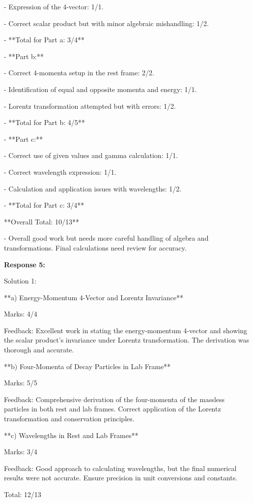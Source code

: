 \documentclass[a4paper,11pt]{article}
\begin{document}
  - Expression of the 4-vector: 1/1.
  
  - Correct scalar product but with minor algebraic mishandling: 1/2.
  
  - **Total for Part a: 3/4**

- **Part b:**

  - Correct 4-momenta setup in the rest frame: 2/2.
  
  - Identification of equal and opposite momenta and energy: 1/1.
  
  - Lorentz transformation attempted but with errors: 1/2.
  
  - **Total for Part b: 4/5**

- **Part c:**

  - Correct use of given values and gamma calculation: 1/1.
  
  - Correct wavelength expression: 1/1.
  
  - Calculation and application issues with wavelengths: 1/2.
  
  - **Total for Part c: 3/4**

**Overall Total: 10/13**

- Overall good work but needs more careful handling of algebra and transformations. Final calculations need review for accuracy.

\bigskip
\textbf{Response 5:}

Solution 1:

**a) Energy-Momentum 4-Vector and Lorentz Invariance**

Marks: 4/4

Feedback: Excellent work in stating the energy-momentum 4-vector and showing the scalar product's invariance under Lorentz transformation. The derivation was thorough and accurate.

**b) Four-Momenta of Decay Particles in Lab Frame**

Marks: 5/5

Feedback: Comprehensive derivation of the four-momenta of the massless particles in both rest and lab frames. Correct application of the Lorentz transformation and conservation principles.

**c) Wavelengths in Rest and Lab Frames**

Marks: 3/4

Feedback: Good approach to calculating wavelengths, but the final numerical results were not accurate. Ensure precision in unit conversions and constants.

Total: 12/13
\end{document}
